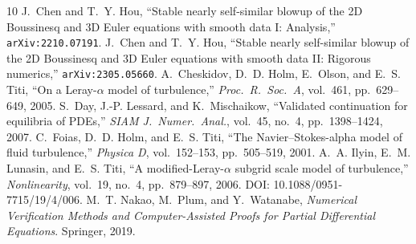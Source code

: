 \documentclass[11pt,a4paper]{article}
\theoremstyle{definition}
\begin{document}
\begin{thebibliography}{10}
 J.~Chen and T.~Y. Hou, ``Stable nearly self-similar blowup of the 2D Boussinesq and 3D Euler equations with smooth data I: Analysis,'' \texttt{arXiv:2210.07191}.
 J.~Chen and T.~Y. Hou, ``Stable nearly self-similar blowup of the 2D Boussinesq and 3D Euler equations with smooth data II: Rigorous numerics,'' \texttt{arXiv:2305.05660}.
 A.~Cheskidov, D.~D. Holm, E.~Olson, and E.~S. Titi, ``On a Leray-$\alpha$ model of turbulence,'' \emph{Proc.\ R.\ Soc.\ A}, vol.~461, pp.~629--649, 2005.
 S.~Day, J.-P. Lessard, and K.~Mischaikow, ``Validated continuation for equilibria of PDEs,'' \emph{SIAM J.\ Numer.\ Anal.}, vol.~45, no.~4, pp.~1398--1424, 2007.
 C.~Foias, D.~D. Holm, and E.~S. Titi, ``The Navier--Stokes-alpha model of fluid turbulence,'' \emph{Physica D}, vol.~152--153, pp.~505--519, 2001.
 A.~A. Ilyin, E.~M. Lunasin, and E.~S. Titi, ``A modified-Leray-$\alpha$ subgrid scale model of turbulence,'' \emph{Nonlinearity}, vol.~19, no.~4, pp.~879--897, 2006. DOI: 10.1088/0951-7715/19/4/006.
 M.~T. Nakao, M.~Plum, and Y.~Watanabe, \emph{Numerical Verification Methods and Computer-Assisted Proofs for Partial Differential Equations}. Springer, 2019.
\end{thebibliography}
\end{document}
